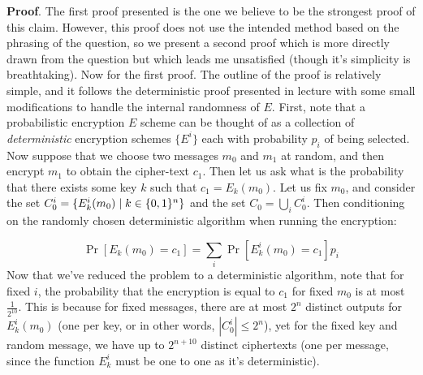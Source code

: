 \documentclass{article}
\begin{document}
\begin{enumerate}[noitemsep,topsep=\mdcompacttopsep,start=4]
\begin{mdbmarginx}{1ex}{0pt}{1ex}{0pt}%
\noindent{}\textbf{Proof}.  The first proof presented is the one we believe to be the strongest proof of this claim. However, this
proof does not use the intended method based on the phrasing of the question, so we present a second
proof which is more directly drawn from the question but which leads me unsatisfied (though it's
simplicity is breathtaking).
Now for the first proof.
The outline of the proof is relatively simple, and it follows the deterministic proof presented in lecture
with some small modifications to handle the internal randomness of $E$. First, note that a probabilistic
encryption $E$ scheme can be thought of as a collection of \emph{deterministic} encryption schemes $\{E^i\}$
each with probability $p_i$ of being selected. Now suppose that we choose two messages $m_0$ and $m_1$ 
at random, and then encrypt $m_1$ to obtain the cipher-text $c_1$. Then let us ask what is 
the probability that there exists some key $k$ such that $c_1 = E_k(m_0)$. Let us fix $m_0$, and consider
the set $C_0^i = \{E^{i}_k(m_0) \mid k \in \{0,1\}^n\}$ and the set $C_0 = \bigcup_i C_0^i$. Then
conditioning on the randomly chosen deterministic algorithm when running the encryption:%
\end{mdbmarginx}%
\noindent\noindent\[%
\Pr[E_k(m_0) = c_1] = \sum_{i} \Pr[E^i_k(m_0) = c_1] p_i
\]%
Now that we've reduced the problem to a deterministic algorithm, note that for fixed $i$, the probability
that the encryption is equal to $c_1$ for fixed $m_0$ is at most $\frac{1}{2^10}$. This is because for 
fixed messages, there are at most $2^n$ distinct outputs for $E^i_k(m_0)$ (one per key, or in other words,
$|C_0^i| \leq 2^n$), yet for the fixed key and random message, we have up to $2^{n+10}$ distinct ciphertexts 
(one per message, since the function $E^i_k$ must be one to one as it's deterministic). 

\end{enumerate}
\end{document}
